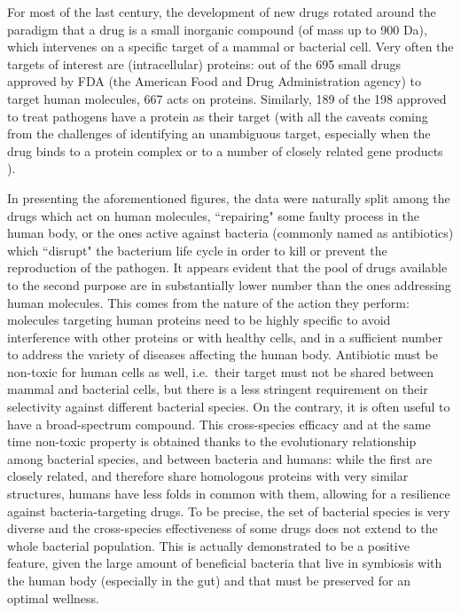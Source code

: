 For most of the last century, the development of new drugs rotated around the paradigm that a drug is a small inorganic compound (of mass up to 900 Da), which intervenes on a specific target of a mammal or bacterial cell. Very often the targets of interest are (intracellular) proteins: out of the 695 small drugs approved by FDA (the American Food and Drug Administration agency) to target human molecules, 667 acts on proteins. Similarly, 189 of the 198 approved to treat pathogens have a protein as their target
%
(with all the caveats coming from the challenges of identifying an unambiguous target, especially when the drug binds to a protein complex or to a number of closely related gene products \citep{Santos2017}).

In presenting the aforementioned figures, the data were naturally split among the drugs which act on human molecules, ``repairing" some faulty process in the human body, or the ones active against bacteria (commonly named as antibiotics) which ``disrupt" the bacterium life cycle in order to kill or prevent the reproduction of the pathogen.
%
It appears evident that the pool of drugs available to the second purpose are in substantially lower number than the ones addressing human molecules. This comes from the nature of the action they perform: molecules targeting human proteins need to be highly specific to avoid interference with other proteins or with healthy cells, and in a sufficient number to address the variety of diseases affecting the human body.
%
Antibiotic must be non-toxic for human cells as well, i.e.\ their target must not be shared between mammal and bacterial cells, but there is a less stringent requirement on their selectivity against different bacterial species. On the contrary, it is often useful to have a broad-spectrum compound. This cross-species efficacy and at the same time non-toxic property is obtained thanks to the evolutionary relationship among bacterial species, and between bacteria and humans: while the first are closely related, and therefore share homologous proteins with very similar structures, humans have less folds in common with them, allowing for a resilience against bacteria-targeting drugs.
%
To be precise, the set of bacterial species is very diverse and the cross-species effectiveness of some drugs does not extend to the whole bacterial population. This is actually demonstrated to be a positive feature, given the large amount of beneficial bacteria that live in symbiosis with the human body (especially in the gut) and that must be preserved for an optimal wellness.

